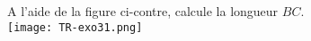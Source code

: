 
\begin{multicols}{2}
A l'aide de la figure ci-contre, calcule la
longueur $BC$.\\
\texttt{[image: TR-exo31.png]} 
\end{multicols}